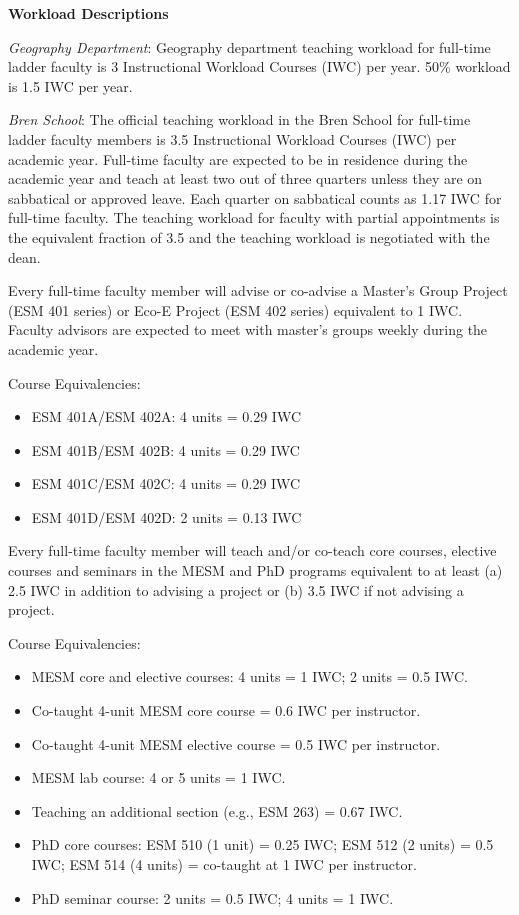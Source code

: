 \documentclass[10pt]{article}
\begin{document}
\vspace{0.5cm}

\textbf{Workload Descriptions}

\begin{enumerate}
{\footnotesize

\item {\em Geography Department}: Geography department teaching workload for full-time ladder faculty is 3 Instructional Workload Courses (IWC) per year. 50\% workload is 1.5 IWC per year.

\item {\em Bren School}:  The official teaching workload in the Bren School for full-time ladder faculty members is 3.5 Instructional Workload Courses (IWC) per academic year. Full-time faculty are expected to be in residence during the academic year and teach at least two out of three quarters unless they are on sabbatical or approved leave. Each quarter on sabbatical counts as 1.17 IWC for full-time faculty. The teaching workload for faculty with partial appointments is the equivalent fraction of 3.5 and the teaching workload is negotiated with the dean.

Every full-time faculty member will advise or co-advise a Master’s Group Project (ESM 401 series) or Eco-E Project (ESM 402 series) equivalent to 1 IWC. Faculty advisors are expected to meet with master’s groups weekly during the academic year.

Course Equivalencies:
\begin{itemize}
    \item ESM 401A/ESM 402A: 4 units = 0.29 IWC 
    \item ESM 401B/ESM 402B: 4 units = 0.29 IWC
    \item ESM 401C/ESM 402C: 4 units = 0.29 IWC
    \item ESM 401D/ESM 402D: 2 units = 0.13 IWC
\end{itemize}

Every full-time faculty member will teach and/or co-teach core courses, elective courses and seminars in the MESM and PhD programs equivalent to at least (a) 2.5 IWC in addition to advising a project or (b) 3.5 IWC if not advising a project. 

Course Equivalencies:
\begin{itemize}
    \item MESM core and elective courses: 4 units = 1 IWC; 2 units = 0.5 IWC.
    \item Co-taught 4-unit MESM core course = 0.6 IWC per instructor.
    \item Co-taught 4-unit MESM elective course = 0.5 IWC per instructor.
    \item MESM lab course: 4 or 5 units = 1 IWC.
    \item Teaching an additional section (e.g., ESM 263) = 0.67 IWC.
    \item PhD core courses: ESM 510 (1 unit) = 0.25 IWC; ESM 512 (2 units) = 0.5 IWC; ESM 514 (4 units) = co-taught at 1 IWC per instructor.
    \item PhD seminar course: 2 units = 0.5 IWC; 4 units = 1 IWC.
\end{itemize}
}
\end{enumerate}
\end{document}
